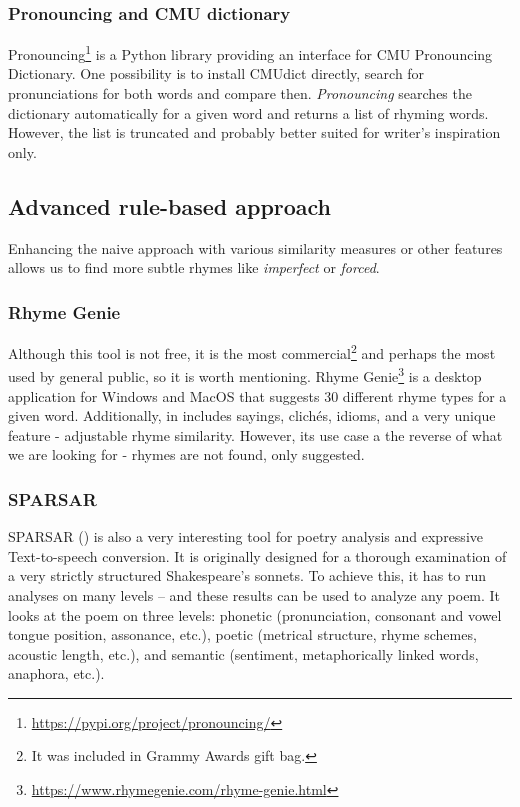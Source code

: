 \subsubsection*{Pronouncing and CMU dictionary}
Pronouncing\footnote{\url{https://pypi.org/project/pronouncing/}} is a Python library providing an interface for CMU Pronouncing Dictionary. One possibility is to install CMUdict directly, search for pronunciations for both words and compare then. \textit{Pronouncing} searches the dictionary automatically for a given word and returns a list of rhyming words. However, the list is truncated and probably better suited for writer's inspiration only.


\subsection{Advanced rule-based approach}
Enhancing the naive approach with various similarity measures or other features allows us to find more subtle rhymes like \textit{imperfect} or \textit{forced}.

\subsubsection*{Rhyme Genie}
Although this tool is not free, it is the most commercial\footnote{It was included in Grammy Awards gift bag.} and perhaps the most used by general public, so it is worth mentioning. Rhyme Genie\footnote{\url{https://www.rhymegenie.com/rhyme-genie.html}} is a desktop application for Windows and MacOS that suggests 30 different rhyme types for a given word. Additionally, in includes sayings, clichés, idioms, and a very unique feature - adjustable rhyme similarity. However, its use case a the reverse of what we are looking for - rhymes are not found, only suggested.

\subsubsection*{SPARSAR}
SPARSAR (\cite{Delmonte2014}) is also a very interesting tool for poetry analysis and expressive Text-to-speech conversion. It is originally designed for a thorough examination of a very strictly structured Shakespeare's sonnets. To achieve this, it has to run analyses on many levels -- and these results can be used to analyze any poem. It looks at the poem on three levels: phonetic (pronunciation, consonant and vowel tongue position, assonance, etc.), poetic (metrical structure, rhyme schemes, acoustic length, etc.), and semantic (sentiment, metaphorically linked words, anaphora, etc.).

